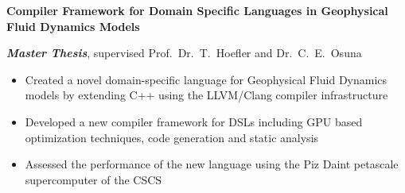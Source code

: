 \textbf{Compiler Framework for Domain Specific Languages in Geophysical Fluid Dynamics Models}

\textbf{\textit{Master Thesis}}, supervised Prof.\ Dr.\ T.\ Hoefler and Dr.\ C.\ E.\ Osuna

\begin{itemize}
	\item Created a novel domain-specific language for Geophysical Fluid Dynamics models by extending C++ using the LLVM/Clang compiler infrastructure
	\item Developed a new compiler framework for DSLs including GPU based optimization techniques, code generation and static analysis 
	\item Assessed the performance of the new language using the Piz Daint petascale supercomputer of the CSCS
\end{itemize}
